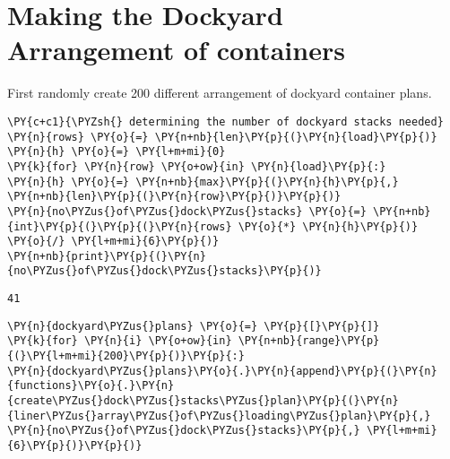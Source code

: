 \section*{Making the Dockyard Arrangement of
containers}\label{making-the-dockyard-arrangement-of-containers}

First randomly create 200 different arrangement of dockyard container
plans.

\begin{tcolorbox}[breakable, size=fbox, boxrule=1pt, pad at break*=1mm,colback=cellbackground, colframe=cellborder]
\begin{Verbatim}[commandchars=\\\{\}]
\PY{c+c1}{\PYZsh{} determining the number of dockyard stacks needed}
\PY{n}{rows} \PY{o}{=} \PY{n+nb}{len}\PY{p}{(}\PY{n}{load}\PY{p}{)}
\PY{n}{h} \PY{o}{=} \PY{l+m+mi}{0}
\PY{k}{for} \PY{n}{row} \PY{o+ow}{in} \PY{n}{load}\PY{p}{:}
\PY{n}{h} \PY{o}{=} \PY{n+nb}{max}\PY{p}{(}\PY{n}{h}\PY{p}{,} \PY{n+nb}{len}\PY{p}{(}\PY{n}{row}\PY{p}{)}\PY{p}{)}
\PY{n}{no\PYZus{}of\PYZus{}dock\PYZus{}stacks} \PY{o}{=} \PY{n+nb}{int}\PY{p}{(}\PY{p}{(}\PY{n}{rows} \PY{o}{*} \PY{n}{h}\PY{p}{)} \PY{o}{/} \PY{l+m+mi}{6}\PY{p}{)}
\PY{n+nb}{print}\PY{p}{(}\PY{n}{no\PYZus{}of\PYZus{}dock\PYZus{}stacks}\PY{p}{)}
\end{Verbatim}
\end{tcolorbox}

\begin{Verbatim}[commandchars=\\\{\}]
41
\end{Verbatim}

\begin{tcolorbox}[breakable, size=fbox, boxrule=1pt, pad at break*=1mm,colback=cellbackground, colframe=cellborder]
\begin{Verbatim}[commandchars=\\\{\}]
\PY{n}{dockyard\PYZus{}plans} \PY{o}{=} \PY{p}{[}\PY{p}{]}
\PY{k}{for} \PY{n}{i} \PY{o+ow}{in} \PY{n+nb}{range}\PY{p}{(}\PY{l+m+mi}{200}\PY{p}{)}\PY{p}{:}
\PY{n}{dockyard\PYZus{}plans}\PY{o}{.}\PY{n}{append}\PY{p}{(}\PY{n}{functions}\PY{o}{.}\PY{n}{create\PYZus{}dock\PYZus{}stacks\PYZus{}plan}\PY{p}{(}\PY{n}{liner\PYZus{}array\PYZus{}of\PYZus{}loading\PYZus{}plan}\PY{p}{,} \PY{n}{no\PYZus{}of\PYZus{}dock\PYZus{}stacks}\PY{p}{,} \PY{l+m+mi}{6}\PY{p}{)}\PY{p}{)}
\end{Verbatim}
\end{tcolorbox}

